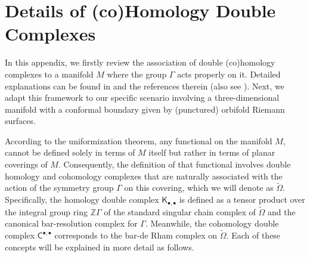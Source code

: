 \documentclass[a4paper,11pt]{article}
\newcommand{\compfontuii}[1]{\bm{\mathsf{#1}}^{\bullet , \bullet}}
\newcommand{\compfontdii}[1]{\bm{\mathsf{#1}}_{\bullet , \bullet}}
\begin{document}
\section{Details of (co)Homology Double Complexes}\label{hocohomdet}
In this appendix, we firstly review the association of double (co)homology complexes to a manifold $M$ where the group $\Gamma$ acts properly on it. Detailed explanations can be found in \cite{Aldrovandi_1997} and the references therein (also see \cite{Takhtajan_2003, park2017potentials, maclane2012homology}). Next, we adapt this framework to our specific scenario involving a three-dimensional manifold with a conformal boundary given by (punctured) orbifold Riemann surfaces.

According to the uniformization theorem, any functional on the manifold $M$, cannot be defined solely in terms of $M$ itself but rather in terms of planar coverings 
of $M$. Consequently, the definition of that functional involves double homology and cohomology complexes that are naturally associated with the action of the symmetry group  $\Gamma$ on this covering, which we will denote as $\tilde{\Omega}$. Specifically, the homology double complex 
$\compfontdii{K}$ is defined as a tensor product over the integral group ring $\mathbb{Z}\Gamma$ of the
standard singular chain complex of $\tilde{\Omega}$ and the canonical bar-resolution complex for $\Gamma$. Meanwhile, the cohomology double complex  $\compfontuii{C}$ corresponds to the bar-de Rham complex on
$\tilde{\Omega}$. Each of these concepts will be explained in more detail as follows.
\end{document}
